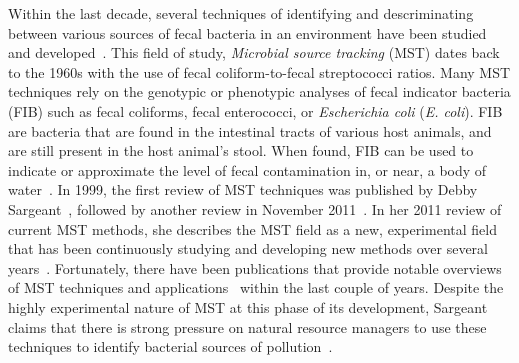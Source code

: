 \documentclass[12pt]{ucthesis}
\begin{document}
   Within the last decade, several techniques of identifying and descriminating
   between various sources of fecal bacteria in an environment have been
   studied and developed~\cite{Sargeant:ReviewMST, Hagedorn:MST_TMDL,
   Lowe:FocusMST, Rivera:MSTCharacterization, Cornelison:MSTTools,
   Chase:FloridaMST}. This field of study, \textit{Microbial source tracking}
   (MST) dates back to the 1960s with the use of fecal coliform-to-fecal
   streptococci ratios. Many MST techniques rely on the genotypic or
   phenotypic analyses of fecal indicator bacteria (FIB) such as fecal
   coliforms, fecal enterococci, or \textit{Escherichia coli} (\textit{E.
   coli}). FIB are bacteria that are found in the intestinal tracts of various
   host animals, and are still present in the host animal's stool. When found,
   FIB can be used to indicate or approximate the level of fecal contamination
   in, or near, a body of water~\cite{Simpson:StateOf}. In 1999, the first
   review of MST techniques was published by Debby
   Sargeant~\cite{Sargeant:Methods}, followed by another review in November
   2011~\cite{Sargeant:ReviewMST}. In her 2011 review of current MST methods,
   she describes the MST field as a new, experimental field that has been
   continuously studying and developing new methods over several
   years~\cite{Sargeant:ReviewMST}. Fortunately, there have been publications
   that provide notable overviews of MST techniques and
   applications~\cite{Hagedorn:CaseStudies, Domingo:Current,
   Harwood:RapidMethods} within the last couple of years. Despite the highly
   experimental nature of MST at this phase of its development, Sargeant claims
   that there is strong pressure on natural resource managers to use these
   techniques to identify bacterial sources of
   pollution~\cite{Sargeant:ReviewMST}.
\end{document}
